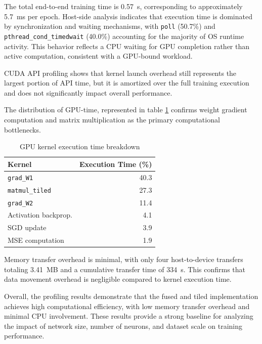 \documentclass[conference, 12pt]{IEEEtran}
\begin{document}
The total end-to-end training time is 0.57~s, corresponding to approximately 5.7~ms per epoch. Host-side analysis indicates that execution time is dominated by synchronization and waiting mechanisms, with \texttt{poll} (50.7\%) and \texttt{pthread\_cond\_timedwait} (40.0\%) accounting for the majority of OS runtime activity. This behavior reflects a CPU waiting for GPU completion rather than active computation, consistent with a GPU-bound workload.

CUDA API profiling shows that kernel launch overhead still represents the largest portion of API time, but it is amortized over the full training execution and does not significantly impact overall performance.

The distribution of GPU-time, represented in table \ref{tab:kernel_time_breakdown} confirms weight gradient computation and matrix multiplication as the primary computational bottlenecks.

\begin{table}[h!]
\centering
\caption{GPU kernel execution time breakdown}
\label{tab:kernel_time_breakdown}
\begin{tabular}{l r}
\toprule
\textbf{Kernel} & \textbf{Execution Time (\%)} \\
\midrule
\texttt{grad\_W1}                & 40.3 \\
\texttt{matmul\_tiled}           & 27.3 \\
\texttt{grad\_W2}                & 11.4 \\
Activation backprop.       & 4.1 \\
SGD update & 3.9 \\
MSE computation                  & 1.9 \\
\bottomrule
\end{tabular}
\end{table}



Memory transfer overhead is minimal, with only four host-to-device transfers totaling 3.41~MB and a cumulative transfer time of 334~\textmu s. This confirms that data movement overhead is negligible compared to kernel execution time.

Overall, the profiling results demonstrate that the fused and tiled implementation achieves high computational efficiency, with low memory transfer overhead and minimal CPU involvement. These results provide a strong baseline for analyzing the impact of network size, number of neurons, and dataset scale on training performance.
\end{document}
